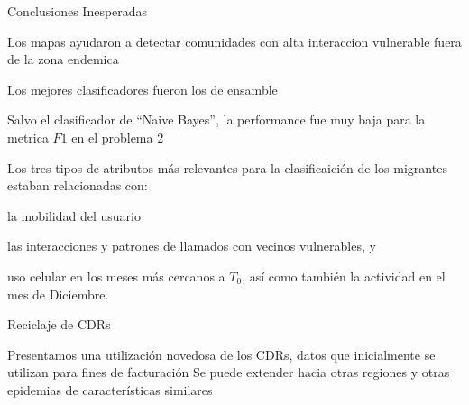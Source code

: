 \documentclass{beamer}
\begin{document}


\begin{frame}{Conclusiones Inesperadas}

	Los mapas ayudaron a detectar comunidades con alta interaccion vulnerable fuera de la zona endemica

	\medskip
	Los mejores clasificadores fueron los de ensamble

	\medskip
	Salvo el clasificador de ``Naive Bayes'', la performance fue muy baja para la metrica $F1$ en el problema 2

	\medskip
	Los tres tipos de atributos más relevantes para la clasificaición de los migrantes estaban relacionadas con:

	\begin{enumerate*}[label={\alph*)},]
		\item la mobilidad del usuario
		\item las interacciones y patrones de llamados con vecinos vulnerables, y
		\item uso celular en los meses más cercanos a $T_0$, así como también la actividad en el mes de Diciembre.
	\end{enumerate*}

\end{frame}


\begin{frame}{Reciclaje de CDRs}
	    
	    Presentamos una utilizaci\'on novedosa de los CDRs, datos que inicialmente se utilizan para fines de facturación
		\medskip
		Se puede extender hacia otras regiones y otras epidemias de características similares
		\medskip
		
\end{frame}

\end{document}
